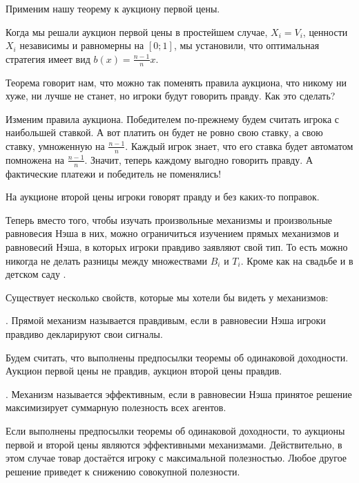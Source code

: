 Применим нашу теорему к аукциону первой цены.

\begin{myex} Когда мы решали аукцион первой цены в простейшем случае, $ X_{i}=V_{i} $, ценности $ X_{i} $ независимы и равномерны на $ [0;1] $, мы установили, что оптимальная стратегия имеет вид $ b(x)=\frac{n-1}{n} x$.

Теорема говорит нам, что можно так поменять правила аукциона, что никому ни хуже, ни лучше не станет, но игроки будут говорить правду. Как это сделать?

Изменим правила аукциона. Победителем по-прежнему будем считать игрока с наибольшей ставкой. А вот платить он будет не ровно свою ставку, а свою ставку, умноженную на $ \frac{n-1}{n} $. Каждый игрок знает, что его ставка будет автоматом помножена на $ \frac{n-1}{n} $. Значит, теперь каждому выгодно говорить правду. А фактические платежи и победитель не поменялись!
\end{myex}

На аукционе второй цены игроки говорят правду и без каких-то поправок.

Теперь вместо того, чтобы изучать произвольные механизмы и произвольные равновесия Нэша в них, можно ограничиться изучением прямых механизмов и равновесий Нэша, в которых игроки правдиво заявляют свой тип. То есть можно никогда не делать разницы между множествами $ B_{i} $ и $ T_{i} $. Кроме как на свадьбе и в детском саду \Smiley.

Существует несколько свойств, которые мы хотели бы видеть у механизмов:

\begin{mydef}
. Прямой механизм называется правдивым, если в равновесии Нэша игроки правдиво декларируют свои сигналы.
\end{mydef}

\begin{myex}
Будем считать, что выполнены предпосылки теоремы об одинаковой доходности. Аукцион первой цены не правдив, аукцион второй цены правдив.
\end{myex}

\begin{mydef} . Механизм называется эффективным, если в равновесии Нэша принятое решение максимизирует суммарную полезность всех агентов.
\end{mydef}

\begin{myex} Если выполнены предпосылки теоремы об одинаковой доходности, то аукционы первой и второй цены являются эффективными механизмами. Действительно, в этом случае товар достаётся игроку с максимальной полезностью. Любое другое решение приведет к снижению совокупной полезности.
\end{myex}

